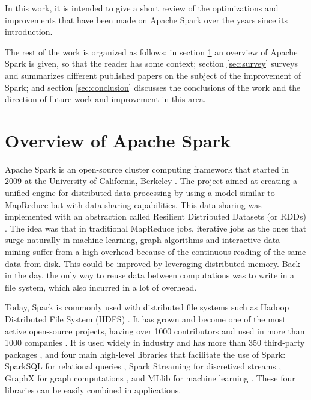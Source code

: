 \documentclass{article}
\begin{document}
In this work, it is intended to give a short review of the optimizations and improvements that have been made on Apache Spark over the years since its introduction. 

The rest of the work is organized as follows: in section \ref{sec:spark_overview} an overview of Apache Spark is given, so that the reader has some context; section \ref{sec:survey} surveys and summarizes different published papers on the subject of the improvement of Spark; and section \ref{sec:conclusion} discusses the conclusions of the work and the direction of future work and improvement in this area.


\section{Overview of Apache Spark}
\label{sec:spark_overview}

Apache Spark \cite{zaharia_spark:_2010} is an open-source cluster computing framework that started in 2009 at the University of California, Berkeley \cite{zaharia_apache_2016}. The project aimed at creating a unified engine for distributed data processing by using a model similar to MapReduce but with data-sharing capabilities. This data-sharing was implemented with an abstraction called Resilient Distributed Datasets (or RDDs) \cite{zaharia_resilient_2012}. The idea was that in traditional MapReduce jobs, iterative jobs as the ones that surge naturally in machine learning, graph algorithms and interactive data mining suffer from a high overhead because of the continuous reading of the same data from disk. This could be improved by leveraging distributed memory. Back in the day, the only way to reuse data between computations was to write in a file system, which also incurred in a lot of overhead. 

Today, Spark is commonly used with distributed file systems such as Hadoop Distributed File System (HDFS) \cite{Shvachko2010}. It has grown and become one of the most active open-source projects, having over 1000 contributors and used in more than 1000 companies \cite{zaharia_apache_2016}. It is used widely in industry and has more than 350 third-party packages \cite{SparkPackages}, and four main high-level libraries that facilitate the use of Spark: SparkSQL for relational queries \cite{armbrust2015spark}, Spark Streaming for discretized streams \cite{zaharia2013discretized}, GraphX for graph computations \cite{gonzalez2014graphx}, and MLlib for machine learning \cite{Meng2016}. These four libraries can be easily combined in applications.
\end{document}
